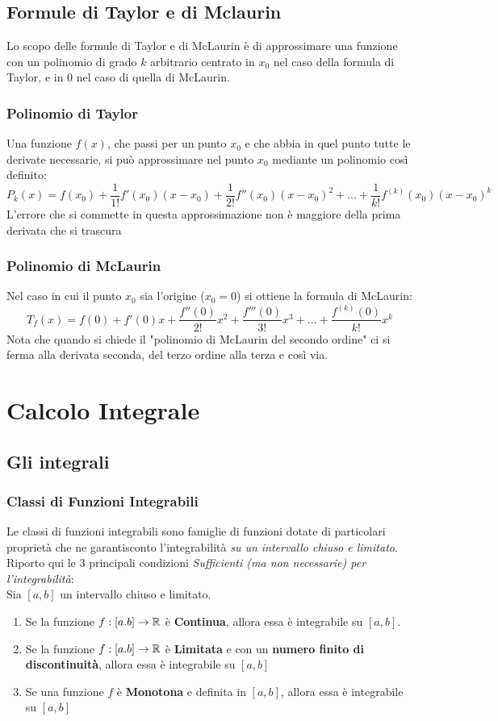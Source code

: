 \documentclass[12pt, a4paper, openany]{book}
\begin{document}
\section{Formule di Taylor e di Mclaurin}
Lo scopo delle formule di Taylor e di McLaurin è di approssimare una funzione con un polinomio di grado $k$ arbitrario centrato in $x_0$ nel caso della formula di Taylor,
e in 0 nel caso di quella di McLaurin.
\subsection*{Polinomio di Taylor}
Una funzione $f(x)$, che passi per un punto $x_0$ e che abbia in quel punto tutte le derivate necessarie,
si può approssimare nel punto $x_0$ mediante un polinomio così definito:
$$P_k(x)=f(x_0)+\frac{1}{1!}f'(x_0)(x-x_0) + \frac{1}{2!}f''(x_0)(x-x_0)^2 +... + \frac{1}{k!}f^{(k)}(x_0)(x-x_0)^k$$
L'errore che si commette in questa approssimazione non è maggiore della prima derivata che si trascura
\subsection*{Polinomio di McLaurin}
Nel caso in cui il punto $x_0$ sia l'origine ($x_0=0$) si ottiene la formula di McLaurin:
$$T_f(x) = f(0) + f'(0)x + \frac{f''(0)}{2!}x^2 + \frac{f'''(0)}{3!}x^3+...+ \frac{f^{(k)}(0)}{k!}x^k$$
Nota che quando si chiede il "polinomio di McLaurin del secondo ordine" ci si ferma alla derivata seconda, del terzo ordine alla terza e così via.
\chapter{Calcolo Integrale}
\section{Gli integrali}
\subsection{Classi di Funzioni Integrabili}
Le classi di funzioni integrabili sono famiglie di funzioni dotate di particolari proprietà che ne garantisconto l'integrabilità \emph{su un intervallo chiuso e limitato}.
Riporto qui le 3 principali condizioni \emph{Sufficienti (ma non necessarie) per l'integrabilità}:
\\Sia $[a,b]$ un intervallo chiuso e limitato.
\begin{enumerate}
	\item Se la funzione $f:[a.b] \to \mathbb{R}$ è \textbf{Continua}, allora essa è integrabile su $[a,b]$.
	\item Se la funzione $f:[a.b] \to \mathbb{R}$ è \textbf{Limitata} e con un \textbf{numero finito di discontinuità}, allora essa è integrabile su $[a,b]$
	\item Se una funzione $f$ è \textbf{Monotona} e definita in $[a,b]$, allora essa è integrabile su $[a,b]$ 
\end{enumerate}
\end{document}
